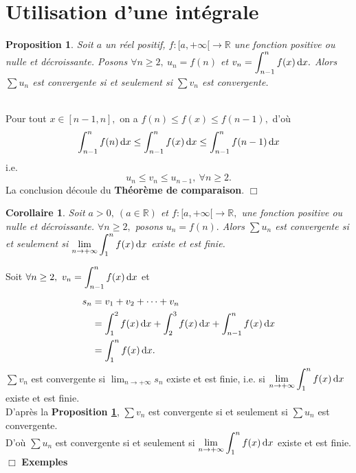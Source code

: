 \documentclass[11pt, a4paper]{book}
\newtheorem{pro}{Proposition}[section]
\newtheorem{cor}{Corollaire}[section]
\newenvironment{pr}{\noindent {\bf Preuve} \noindent} {\hfill $\Box$\vskip 5mm}
\begin{document}
\section{Utilisation d'une int\'egrale} 
\begin{pro} \label{pro2.2.2.1} Soit $a$ un r\'eel positif, $f:[a,+\infty[\rightarrow \mathbb{R}$ une fonction positive ou nulle et d\'ecroissante. Posons $\forall n\geq 2,~u_n=f(n)$ et ${\displaystyle v_n= \int_{n-1}^n f(x)\,\mathrm{d} x}.$ Alors $\sum u_n$ est convergente si et seulement si $\sum v_n$ est convergente.\end{pro}
\begin{pr}\\ Pour tout $x\in [n-1,n],$ on a $f(n)\leq f(x)\leq f(n-1),$ d'o\`u $$ \int_{n-1}^n f(n)\,\mathrm{d} x \leq \int_{n-1}^n f(x)\,\mathrm{d} x \leq \int_{n-1}^n f(n-1)\,\mathrm{d} x$$ i.e. $$ u_n \leq v_n \leq u_{n-1},~ \forall n\geq 2.$$ La conclusion d\'ecoule du \textbf{Th\'eor\`eme de comparaison}.
\end{pr}
\begin{cor} \label{cor2.2.2.1} Soit $a>0, ~(a\in \mathbb{R})$ et $f:[a,+\infty[\rightarrow \mathbb{R},$ une fonction positive ou nulle et d\'ecroissante. $\forall n \geq2,$ posons $u_n=f(n).$ Alors $\sum u_n$ est convergente si et seulement si ${\displaystyle \lim_{n\rightarrow+\infty}\int_1^n f(x)\,\mathrm{d} x}$ existe et est finie.
\end{cor}
\begin{pr} \quad Soit ${\displaystyle \forall n\geq2,~v_n=\int_{n-1}^nf(x)\,\mathrm{d} x}$ et \begin{align*} s_n &=v_1+v_2+\cdots +v_n\\ &=\int_1^2 f(x)\,\mathrm{d} x+\int_2^3 f(x)\,\mathrm{d} x+\int_{n-1}^n f(x)\,\mathrm{d} x\\ &= \int_1^n f(x)\,\mathrm{d} x. \end{align*} $\sum v_n$ est convergente si ${\displaystyle \lim_{n\rightarrow+\infty} s_n}$ existe et est finie, i.e. si ${\displaystyle \lim_{n\rightarrow+\infty}\int_1^n f(x)\,\mathrm{d} x}$ existe et est finie.\\ D'apr\`es la \textbf{Proposition \ref{pro2.2.2.1}}, $\sum v_n$ est convergente si et seulement si $\sum u_n$ est convergente.\\ D'o\`u $\sum u_n$ est convergente si et seulement si ${\displaystyle \lim_{n\rightarrow+\infty}\int_1^n f(x)\,\mathrm{d} x}$ existe et est finie.
\end{pr}
\textbf{Exemples}
\end{document}
